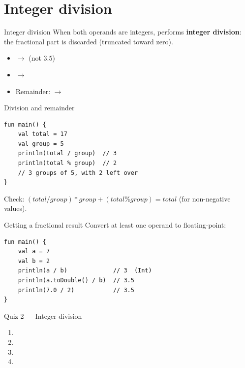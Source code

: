 \documentclass[aspectratio=169,11pt]{beamer}
\begin{document}
    \section{Integer division}

    \begin{frame}{Integer division}
        When both operands are integers, \kotlincode{/} performs \textbf{integer division}:
        the fractional part is discarded (truncated toward zero).
        \vspace{0.6em}
        \begin{itemize}
            \item {} $\rightarrow$  (not $3.5$)
            \item {} $\rightarrow$ 
            \item Remainder:  $\rightarrow$ 
        \end{itemize}
    \end{frame}

    \begin{frame}[fragile]{Division and remainder}
        \begin{lstlisting}
fun main() {
    val total = 17
    val group = 5
    println(total / group)  // 3
    println(total % group)  // 2
    // 3 groups of 5, with 2 left over
}
        \end{lstlisting}
        \vspace{0.3em}
        Check: $(total / group) * group + (total \% group) = total$
        (for non-negative values).
    \end{frame}

    \begin{frame}[fragile]{Getting a fractional result}
        Convert at least one operand to floating-point:
        \vspace{0.3em}
        \begin{lstlisting}
fun main() {
    val a = 7
    val b = 2
    println(a / b)             // 3  (Int)
    println(a.toDouble() / b)  // 3.5
    println(7.0 / 2)           // 3.5
}
        \end{lstlisting}
    \end{frame}

    \begin{frame}{Quiz 2 --- Integer division}
        \begin{enumerate}
            \item \kotlincode{6.666\ldots}
            \item {}
            \item {}
            \item {}
        \end{enumerate}
        \quizpause
    \end{frame}
\end{document}
